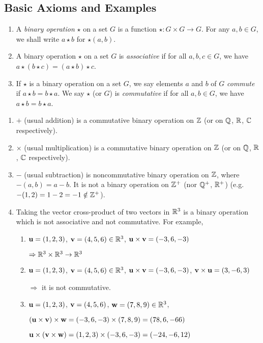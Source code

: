 \subsection{Basic Axioms and Examples}
{\begin{enumerate}[leftmargin=20pt, itemsep=0pt, topsep=3pt]
    \item A {\sl binary operation} $\star$ on a set $G$ is a function $\star:G\times G\to G$.
    For any $a,b\in G$, we shall write $a\star b$ for $\star(a,b)$.
    \item A binary operation $\star$ on a set $G$ is {\sl associative} if for all $a,b,c\in G$,
    we have $a\star (b\star c) = (a\star b)\star c$.
    \item If $\star$ is a binary operation on a set $G$, we say elements $a$ and $b$ of $G$
    {\sl commute} if $a\star b = b\star a$.
    We say $\star$ (or $G$) is {\sl commutative} if for all $a,b\in G$, we have $a\star b = b\star a$.
\end{enumerate}}
{\begin{enumerate}[leftmargin=20pt, itemsep=0pt, topsep=3pt]
    \item $+$ (usual addition) is a commutative binary operation on $\mathbb{Z}$ (or on $\mathbb{Q}$, $\mathbb{R}$, $\mathbb{C}$ respectively).
    \item $\times$ (usual multiplication) is a commutative binary operation on $\mathbb{Z}$ (or on $\mathbb{Q}$, $\mathbb{R}$, $\mathbb{C}$ respectively).
    \item $-$ (usual subtraction) is noncommutative binary operation on $\mathbb{Z}$, where $-(a,b) = a-b$.
    It is not a binary operation on $\mathbb{Z}^{+}$ (nor $\mathbb{Q}^{+}$, $\mathbb{R}^{+}$) (e.g. $-(1,2) = 1-2 = -1 \notin \mathbb{Z}^{+}$).
    \item Taking the vector cross-product of two vectors in $\mathbb{R}^{3}$ is a binary operation which is not associative and not commutative. For example,
    \begin{enumerate}[leftmargin=20pt, itemsep=0pt, topsep=0pt, label=(\arabic*)]
        \item ${\bf u} = (1,2,3)$, ${\bf v} = (4,5,6)\in\mathbb{R}^{3}$, ${\bf u}\times{\bf v} = (-3, 6, -3)$
        
        $\Rightarrow \mathbb{R}^{3}\times\mathbb{R}^{3}\to \mathbb{R}^{3}$
        \item ${\bf u} = (1,2,3)$, ${\bf v} = (4,5,6)\in\mathbb{R}^{3}$, ${\bf u}\times{\bf v} = (-3, 6, -3)$, ${\bf v}\times{\bf u} = (3, -6, 3)$
        
        $\Rightarrow$ it is not commutative.
        \item ${\bf u} = (1,2,3)$, ${\bf v} = (4,5,6)$, ${\bf w} = (7,8,9)\in\mathbb{R}^{3}$,
        
        $({\bf u}\times{\bf v})\times{\bf w} = (-3, 6, -3)\times(7,8,9) = (78,6,-66)$

        ${\bf u}\times({\bf v}\times{\bf w}) = (1,2,3)\times(-3,6,-3) = (-24,-6,12)$
    \end{enumerate}
\end{enumerate}
}
